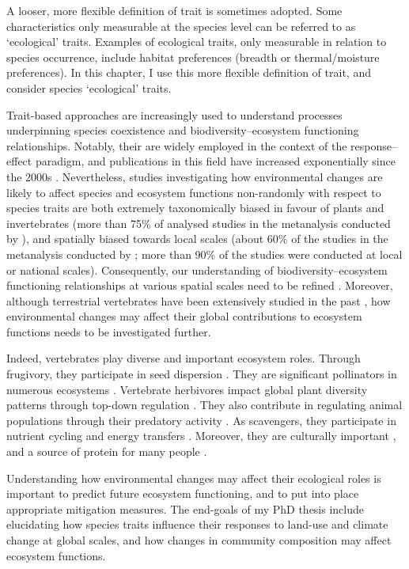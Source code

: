 A looser, more flexible definition of trait is sometimes adopted. Some characteristics only measurable at the species level can be referred to as `ecological' traits. Examples of ecological traits, only measurable in relation to species occurrence, include habitat preferences (breadth or thermal/moisture preferences). In this chapter, I use this more flexible definition of trait, and consider species `ecological' traits.

Trait-based approaches are increasingly used to understand processes underpinning species coexistence and biodiversity--ecosystem functioning relationships. Notably, their are widely employed in the context of the response--effect paradigm, and publications in this field have increased exponentially since the 2000s \citep{Hevia2017}. Nevertheless, studies investigating how environmental changes are likely to affect species and ecosystem functions non-randomly with respect to species traits are both extremely taxonomically biased in favour of plants and invertebrates (more than 75\% of analysed studies in the metanalysis conducted by \citet{Hevia2017}), and spatially biased towards local scales (about 60\% of the studies in the metanalysis conducted by \citet{Hevia2017}; more than 90\% of the studies were conducted at local or national scales). Consequently, our understanding of biodiversity--ecosystem functioning relationships at various spatial scales need to be refined \citep{Thompson2018, Isbell2018}. Moreover, although terrestrial vertebrates have been extensively studied in the past \citep{Titley2017}, how environmental changes may affect their global contributions to ecosystem functions needs to be investigated further. 

Indeed, vertebrates play diverse and important ecosystem roles. Through frugivory, they  participate in seed dispersion \citep{Wandrag2015, Mokany2014, McConkey2012}. They are significant pollinators in numerous ecosystems \citep{Ratto2018}. Vertebrate herbivores impact global plant diversity patterns through top-down regulation \citep{Lin2018, Zhang2018}. They also contribute in regulating animal populations through their predatory activity \citep{Paine2016, Luck2012, Letnic2012, Salo2010, Barber2010}. As scavengers, they participate in nutrient cycling and energy transfers \citep{Cunningham2018, Inger2016, Wilson2011}. Moreover, they are culturally important \citep{Hirons, Albert2018}, and a source of protein for many people \citep{Alves2018}.

Understanding how environmental changes may affect their ecological roles is important to predict future ecosystem functioning, and to put into place appropriate mitigation measures. The end-goals of my PhD thesis include elucidating how species traits influence their responses to land-use and climate change at global scales, and how changes in community composition may affect ecosystem functions.

